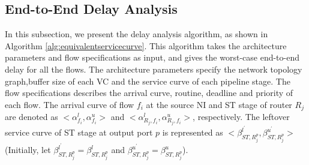 \documentclass[preprint]{elsarticle}
\begin{document}
\subsection{End-to-End Delay Analysis}\label{e2elatency1}
In this subsection, we present the delay analysis algorithm, as shown in Algorithm \ref{alg:equivalentservicecurve}. This algorithm takes the architecture parameters and flow specifications as input, and gives the worst-case end-to-end delay for all the flows. The architecture parameters specify the network topology graph,buffer size of each VC and the service curve of each pipeline stage. The flow specifications describes the arrival curve, routine, deadline and priority of each flow. The arrival curve of flow $f_i$ at the source NI and ST stage of router $R_j$ are denoted as $<\alpha_{f_i}^l,\alpha_{f_i}^u>$ and $<\alpha_{R_j,f_i}^l,\alpha_{R_j,f_i}^u>$, respectively. The leftover service curve of ST stage at output port $p$ is represented as $<\beta_{ST,R_j^{p}}^{l^\prime},\beta_{ST,R_j^{p}}^{u^\prime}>$ (Initially, let $\beta_{ST,R_j^{p}}^{l^\prime}=\beta_{ST,R_j^{p}}^{l}$ and $\beta_{ST,R_j^{p}}^{u^\prime}=\beta_{ST,R_j^{p}}^{u}$).
\end{document}
